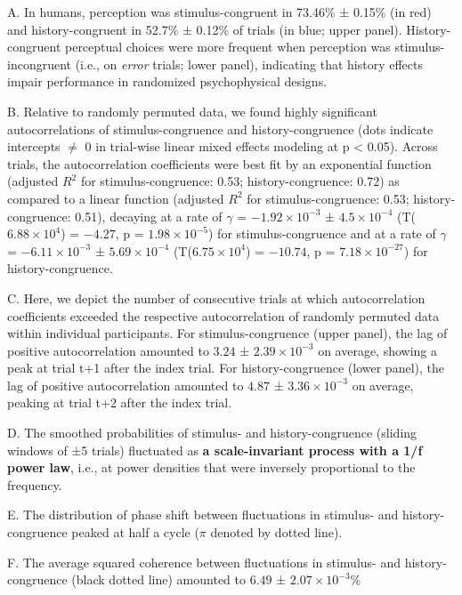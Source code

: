 \documentclass[
]{article}
\begin{document}
A. In humans, perception was stimulus-congruent in 73.46\% ± 0.15\% (in
red) and history-congruent in 52.7\% ± 0.12\% of trials (in blue; upper
panel). History-congruent perceptual choices were more frequent when
perception was stimulus-incongruent (i.e., on \emph{error} trials; lower
panel), indicating that history effects impair performance in randomized
psychophysical designs.

B. Relative to randomly permuted data, we found highly significant
autocorrelations of stimulus-congruence and history-congruence (dots
indicate intercepts \(\neq\) 0 in trial-wise linear mixed effects
modeling at p \textless{} 0.05). Across trials, the autocorrelation
coefficients were best fit by an exponential function (adjusted \(R^2\)
for stimulus-congruence: 0.53; history-congruence: 0.72) as compared to
a linear function (adjusted \(R^2\) for stimulus-congruence: 0.53;
history-congruence: 0.51), decaying at a rate of \(\gamma\) =
\(\ensuremath{-1.92\times 10^{-3}}\) ±
\(\ensuremath{4.5\times 10^{-4}}\)
(T(\(\ensuremath{6.88\times 10^{4}}\)) = \(-4.27\), p =
\(\ensuremath{1.98\times 10^{-5}}\)) for stimulus-congruence and at a
rate of \(\gamma\) = \(\ensuremath{-6.11\times 10^{-3}}\) ±
\(\ensuremath{5.69\times 10^{-4}}\)
(T(\(\ensuremath{6.75\times 10^{4}}\)) = \(-10.74\), p =
\(\ensuremath{7.18\times 10^{-27}}\)) for history-congruence.

C. Here, we depict the number of consecutive trials at which
autocorrelation coefficients exceeded the respective autocorrelation of
randomly permuted data within individual participants. For
stimulus-congruence (upper panel), the lag of positive autocorrelation
amounted to \(3.24\) ± \(\ensuremath{2.39\times 10^{-3}}\) on average,
showing a peak at trial t+1 after the index trial. For
history-congruence (lower panel), the lag of positive autocorrelation
amounted to \(4.87\) ± \(\ensuremath{3.36\times 10^{-3}}\) on average,
peaking at trial t+2 after the index trial.

D. The smoothed probabilities of stimulus- and history-congruence
(sliding windows of ±5 trials) fluctuated as \textbf{a scale-invariant
process with a 1/f power law}, i.e., at power densities that were
inversely proportional to the frequency.

E. The distribution of phase shift between fluctuations in stimulus- and
history-congruence peaked at half a cycle (\(\pi\) denoted by dotted
line).

F. The average squared coherence between fluctuations in stimulus- and
history-congruence (black dotted line) amounted to \(6.49\) ±
\(\ensuremath{2.07\times 10^{-3}}\)\%
\end{document}
